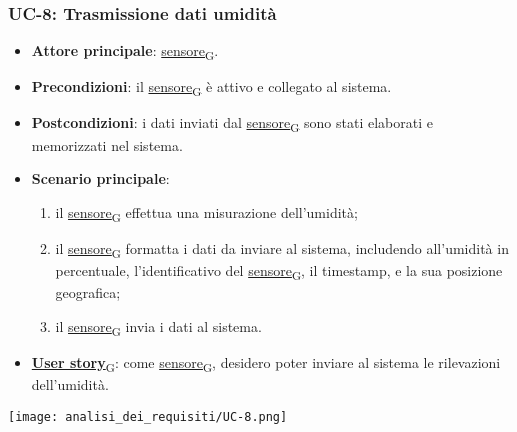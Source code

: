 \subsubsection{UC-8: Trasmissione dati umidità}
\begin{itemize}
	\item \textbf{Attore principale}: \href{https://7last.github.io/docs/pb/documentazione-interna/glossario\#sensore}{sensore\textsubscript{G}}.
	\item \textbf{Precondizioni}: il \href{https://7last.github.io/docs/pb/documentazione-interna/glossario\#sensore}{sensore\textsubscript{G}} è attivo e collegato al sistema.
	\item \textbf{Postcondizioni}: i dati inviati dal \href{https://7last.github.io/docs/pb/documentazione-interna/glossario\#sensore}{sensore\textsubscript{G}} sono stati elaborati e memorizzati nel sistema.
	\item \textbf{Scenario principale}:
	      \begin{enumerate}
		      \item il \href{https://7last.github.io/docs/pb/documentazione-interna/glossario\#sensore}{sensore\textsubscript{G}} effettua una misurazione dell'umidità;
		      \item il \href{https://7last.github.io/docs/pb/documentazione-interna/glossario\#sensore}{sensore\textsubscript{G}} formatta i dati da inviare al sistema, includendo all'umidità in percentuale, l'identificativo del \href{https://7last.github.io/docs/pb/documentazione-interna/glossario\#sensore}{sensore\textsubscript{G}},
		            il timestamp, e la sua posizione geografica;
		      \item il \href{https://7last.github.io/docs/pb/documentazione-interna/glossario\#sensore}{sensore\textsubscript{G}} invia i dati al sistema.
	      \end{enumerate}
	\item \href{https://7last.github.io/docs/pb/documentazione-interna/glossario\#user-story}{\textbf{User story}\textsubscript{G}}: come \href{https://7last.github.io/docs/pb/documentazione-interna/glossario\#sensore}{sensore\textsubscript{G}}, desidero poter inviare al sistema le rilevazioni dell'umidità.
\end{itemize}

\begin{center}
	\texttt{[image: analisi\_dei\_requisiti/UC-8.png]}
\end{center}

